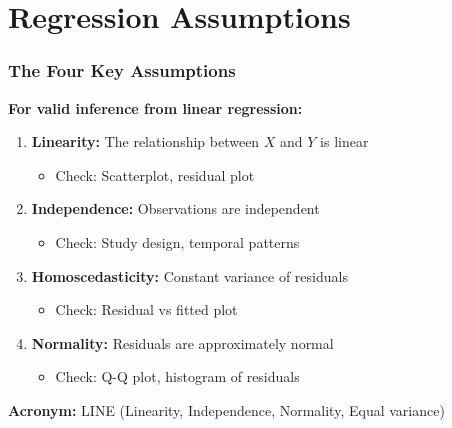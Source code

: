 \documentclass{beamer}
\begin{document}
\section{Regression Assumptions}

\begin{frame}
\frametitle{The Four Key Assumptions}
\textbf{For valid inference from linear regression:}

\vspace{0.3cm}
\begin{enumerate}
\item \textbf{Linearity:} The relationship between $X$ and $Y$ is linear
  \begin{itemize}
  \item Check: Scatterplot, residual plot
  \end{itemize}

\item \textbf{Independence:} Observations are independent
  \begin{itemize}
  \item Check: Study design, temporal patterns
  \end{itemize}

\item \textbf{Homoscedasticity:} Constant variance of residuals
  \begin{itemize}
  \item Check: Residual vs fitted plot
  \end{itemize}

\item \textbf{Normality:} Residuals are approximately normal
  \begin{itemize}
  \item Check: Q-Q plot, histogram of residuals
  \end{itemize}
\end{enumerate}

\vspace{0.3cm}
\textbf{Acronym:} LINE (Linearity, Independence, Normality, Equal variance)
\end{frame}
\end{document}

